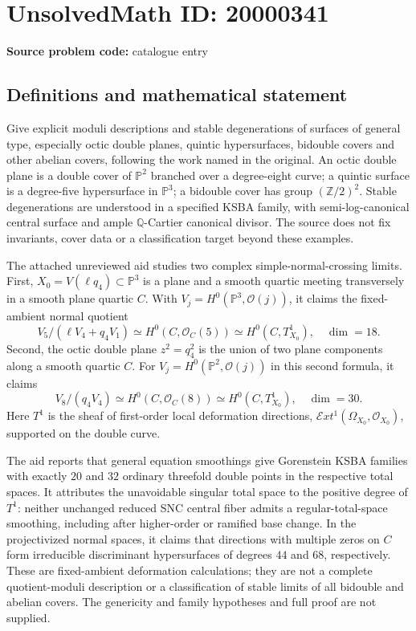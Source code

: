 \documentclass[11pt]{article}
\newcommand{\Z}{\mathbb{Z}}
\newcommand{\Q}{\mathbb{Q}}
\newcommand{\PP}{\mathbb{P}}
\begin{document}
\section*{UnsolvedMath ID: 20000341}
\textbf{Source problem code:} catalogue entry
\subsection{Definitions and mathematical statement}
Give explicit moduli descriptions and stable degenerations of surfaces of general type, especially octic double planes, quintic hypersurfaces, bidouble covers and other abelian covers, following the work named in the original. An octic double plane is a double cover of $\PP^2$ branched over a degree-eight curve; a quintic surface is a degree-five hypersurface in $\PP^3$; a bidouble cover has group $(\Z/2)^2$. Stable degenerations are understood in a specified KSBA family, with semi-log-canonical central surface and ample $\Q$-Cartier canonical divisor. The source does not fix invariants, cover data or a classification target beyond these examples.

The attached unreviewed aid studies two complex simple-normal-crossing limits. First, $X_0=V(\ell q_4)\subset\PP^3$ is a plane and a smooth quartic meeting transversely in a smooth plane quartic $C$. With $V_j=H^0(\PP^3,\mathcal O(j))$, it claims the fixed-ambient normal quotient
\[
V_5/(\ell V_4+q_4V_1)\simeq H^0(C,\mathcal O_C(5))\simeq H^0(C,T^1_{X_0}),\quad\dim=18.
\]
Second, the octic double plane $z^2=q_4^2$ is the union of two plane components along a smooth quartic $C$. For $V_j=H^0(\PP^2,\mathcal O(j))$ in this second formula, it claims
\[
V_8/(q_4V_4)\simeq H^0(C,\mathcal O_C(8))\simeq H^0(C,T^1_{X_0}),\quad\dim=30.
\]
Here $T^1$ is the sheaf of first-order local deformation directions, $\mathcal E xt^1(\Omega_{X_0},\mathcal O_{X_0})$, supported on the double curve.

The aid reports that general equation smoothings give Gorenstein KSBA families with exactly $20$ and $32$ ordinary threefold double points in the respective total spaces. It attributes the unavoidable singular total space to the positive degree of $T^1$: neither unchanged reduced SNC central fiber admits a regular-total-space smoothing, including after higher-order or ramified base change. In the projectivized normal spaces, it claims that directions with multiple zeros on $C$ form irreducible discriminant hypersurfaces of degrees $44$ and $68$, respectively. These are fixed-ambient deformation calculations; they are not a complete quotient-moduli description or a classification of stable limits of all bidouble and abelian covers. The genericity and family hypotheses and full proof are not supplied.
\end{document}
